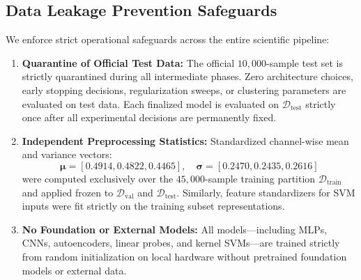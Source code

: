 \subsection{Data Leakage Prevention Safeguards}
We enforce strict operational safeguards across the entire scientific pipeline:
\begin{enumerate}
    \item \textbf{Quarantine of Official Test Data:} The official $10{,}000$-sample test set is strictly quarantined during all intermediate phases. Zero architecture choices, early stopping decisions, regularization sweeps, or clustering parameters are evaluated on test data. Each finalized model is evaluated on $\mathcal{D}_{\text{test}}$ strictly once after all experimental decisions are permanently fixed.
    \item \textbf{Independent Preprocessing Statistics:} Standardized channel-wise mean and variance vectors:
    \begin{equation}
        \boldsymbol{\mu} = [0.4914, 0.4822, 0.4465], \quad \boldsymbol{\sigma} = [0.2470, 0.2435, 0.2616]
    \end{equation}
    were computed exclusively over the $45{,}000$-sample training partition $\mathcal{D}_{\text{train}}$ and applied frozen to $\mathcal{D}_{\text{val}}$ and $\mathcal{D}_{\text{test}}$. Similarly, feature standardizers for SVM inputs were fit strictly on the training subset representations.
    \item \textbf{No Foundation or External Models:} All models—including MLPs, CNNs, autoencoders, linear probes, and kernel SVMs—are trained strictly from random initialization on local hardware without pretrained foundation models or external data.
\end{enumerate}
